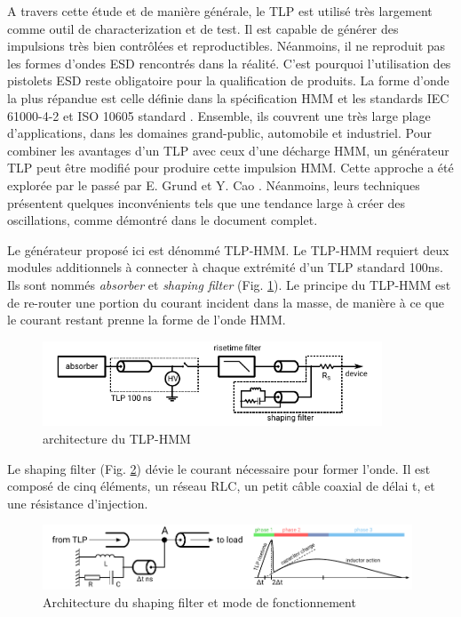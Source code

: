 A travers cette étude et de manière générale, le TLP est utilisé très largement comme outil de characterization et de test.
Il est capable de générer des impulsions très bien contrôlées et reproductibles.
Néanmoins, il ne reproduit pas les formes d'ondes ESD rencontrés dans la réalité.
C'est pourquoi l'utilisation des pistolets ESD reste obligatoire pour la qualification de produits.
La forme d'onde la plus répandue est celle définie dans la spécification HMM \cite{hmm} et les standards IEC 61000-4-2 \cite{iec61000-4-2} et ISO 10605 standard \cite{iso10605}.
Ensemble, ils couvrent une très large plage d'applications, dans les domaines grand-public, automobile et industriel.
Pour combiner les avantages d'un TLP avec ceux d'une décharge HMM, un générateur TLP peut être modifié pour produire cette impulsion HMM.
Cette approche a été explorée par le passé par E. Grund \cite{iec61000-tlp} et Y. Cao \cite{tlp-based-hmm}.
Néanmoins, leurs techniques présentent quelques inconvénients tels que une tendance large à créer des oscillations, comme démontré dans le document complet.

Le générateur proposé ici est dénommé TLP-HMM.
Le TLP-HMM requiert deux modules additionnels à connecter à chaque extrémité d'un TLP standard 100ns.
Ils sont nommés \textit{absorber} et \textit{shaping filter} (Fig. \ref{fig:tlp_hmm_architecture}).
Le principe du TLP-HMM est de re-router une portion du courant incident dans la masse, de manière à ce que le courant restant prenne la forme de l'onde HMM.

\begin{figure}[!h]
  \centering
  \includegraphics[width=0.9\textwidth]{src/1/figures/beges_tlp_hmm.pdf}
  \caption{architecture du TLP-HMM}
  \label{fig:tlp_hmm_architecture}
\end{figure}

Le shaping filter (Fig. \ref{fig:shaping_filter_example}) dévie le courant nécessaire pour former l'onde.
Il est composé de cinq éléments, un réseau RLC, un petit câble coaxial de délai \textDelta{}t, et une résistance d'injection.

\begin{figure}[!h]
  \centering
  \includegraphics[width=0.98\textwidth]{src/1/figures/example_tlp_hmm.pdf}
  \caption{Architecture du shaping filter et mode de fonctionnement}
  \label{fig:shaping_filter_example}
\end{figure}


